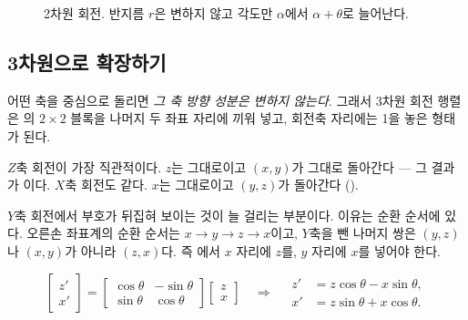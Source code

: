 \begin{figure}[ht]
\renewcommand{\figurename}{그림}
\centering
{}
\caption{2차원 회전. 반지름 $r$은 변하지 않고 각도만 $\alpha$에서
         $\alpha + \theta$로 늘어난다.}
\label{fig:hw2-bg-rot2d}
\end{figure}

\subsection{3차원으로 확장하기}
\label{sec:hw2-bg-3d}

어떤 축을 중심으로 돌리면 \emph{그 축 방향 성분은 변하지 않는다}. 그래서 3차원
회전 행렬은 의 $2 \times 2$ 블록을 나머지 두 좌표 자리에
끼워 넣고, 회전축 자리에는 1을 놓은 형태가 된다.

$Z$축 회전이 가장 직관적이다. $z$는 그대로이고 $(x, y)$가
 그대로 돌아간다 --- 그 결과가 이다.
$X$축 회전도 같다. $x$는 그대로이고 $(y, z)$가 돌아간다
().

$Y$축 회전에서 부호가 뒤집혀 보이는 것이 늘 걸리는 부분이다. 이유는 순환 순서에
있다. 오른손 좌표계의 순환 순서는 $x \to y \to z \to x$이고, $Y$축을 뺀 나머지 쌍은
$(y, z)$나 $(x, y)$가 아니라 $(z, x)$다. 즉 에서
$x$ 자리에 $z$를, $y$ 자리에 $x$를 넣어야 한다.

\begin{equation}
\label{eq:hw2-bg-yblock}
\begin{bmatrix} z' \\ x' \end{bmatrix}
=
\begin{bmatrix}
\cos\theta & -\sin\theta \\
\sin\theta & \cos\theta
\end{bmatrix}
\begin{bmatrix} z \\ x \end{bmatrix}
\quad\Longrightarrow\quad
\begin{aligned}
z' &= z\cos\theta - x\sin\theta, \\
x' &= z\sin\theta + x\cos\theta.
\end{aligned}
\end{equation}


